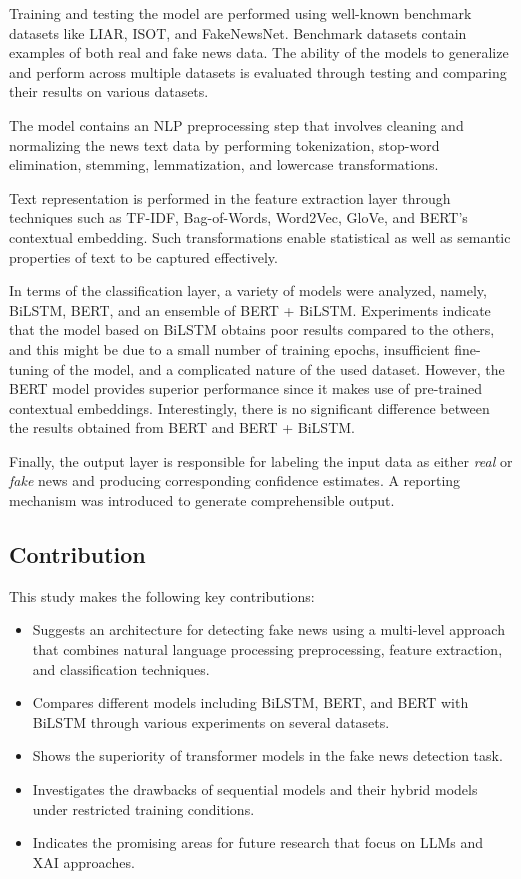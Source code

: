 \documentclass[runningheads]{llncs}
\begin{document}
Training and testing the model are performed using well-known benchmark datasets like LIAR, ISOT, and FakeNewsNet. Benchmark datasets contain examples of both real and fake news data. The ability of the models to generalize and perform across multiple datasets is evaluated through testing and comparing their results on various datasets.

The model contains an NLP preprocessing step that involves cleaning and normalizing the news text data by performing tokenization, stop-word elimination, stemming, lemmatization, and lowercase transformations.

Text representation is performed in the feature extraction layer through techniques such as TF-IDF, Bag-of-Words, Word2Vec, GloVe, and BERT’s contextual embedding. Such transformations enable statistical as well as semantic properties of text to be captured effectively.

In terms of the classification layer, a variety of models were analyzed, namely, BiLSTM, BERT, and an ensemble of BERT + BiLSTM. Experiments indicate that the model based on BiLSTM obtains poor results compared to the others, and this might be due to a small number of training epochs, insufficient fine-tuning of the model, and a complicated nature of the used dataset. However, the BERT model provides superior performance since it makes use of pre-trained contextual embeddings. Interestingly, there is no significant difference between the results obtained from BERT and BERT + BiLSTM.

Finally, the output layer is responsible for labeling the input data as either \textit{real} or \textit{fake} news and producing corresponding confidence estimates. A reporting mechanism was introduced to generate comprehensible output.

\subsection{Contribution}

This study makes the following key contributions:

\begin{itemize}
\item Suggests an architecture for detecting fake news using a multi-level approach that combines natural language processing preprocessing, feature extraction, and classification techniques.
\item Compares different models including BiLSTM, BERT, and BERT with BiLSTM through various experiments on several datasets.
\item Shows the superiority of transformer models in the fake news detection task.
\item Investigates the drawbacks of sequential models and their hybrid models under restricted training conditions.
\item Indicates the promising areas for future research that focus on LLMs and XAI approaches.
\end{itemize}
\end{document}
